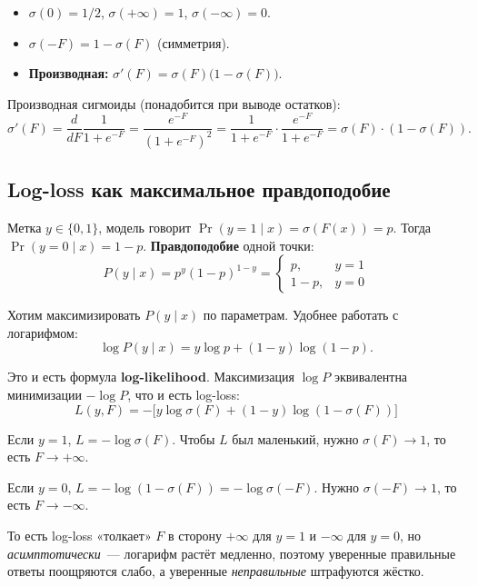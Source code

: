 \documentclass[12pt,a4paper]{article}
\begin{document}
\begin{itemize}
  \item $\sigma(0) = 1/2$, $\sigma(+\infty) = 1$, $\sigma(-\infty) = 0$.
  \item $\sigma(-F) = 1 - \sigma(F)$ (симметрия).
  \item \textbf{Производная:} $\sigma'(F) = \sigma(F)\bigl(1 - \sigma(F)\bigr)$.
\end{itemize}

\begin{derivation}
Производная сигмоиды (понадобится при выводе остатков):
\[
  \sigma'(F) = \frac{d}{dF}\frac{1}{1+e^{-F}}
  = \frac{e^{-F}}{(1+e^{-F})^2}
  = \frac{1}{1+e^{-F}} \cdot \frac{e^{-F}}{1+e^{-F}}
  = \sigma(F) \cdot (1 - \sigma(F)).
\]
\end{derivation}

\subsection{Log-loss как максимальное правдоподобие}

Метка $y \in \{0, 1\}$, модель говорит $\Pr(y = 1 \mid x) = \sigma(F(x)) = p$. Тогда $\Pr(y = 0 \mid x) = 1 - p$. \textbf{Правдоподобие} одной точки:
\[
  P(y \mid x) = p^y (1-p)^{1-y} =
  \begin{cases}
    p, & y = 1\\
    1-p, & y = 0
  \end{cases}
\]

Хотим максимизировать $P(y \mid x)$ по параметрам. Удобнее работать с логарифмом:
\[
  \log P(y \mid x) = y \log p + (1-y)\log(1-p).
\]

Это и есть формула \textbf{log-likelihood}. Максимизация $\log P$ эквивалентна минимизации $-\log P$, что и есть log-loss:
\[
  \boxed{
  L(y, F) = -\bigl[y \log \sigma(F) + (1-y)\log(1 - \sigma(F))\bigr]
  }
\]

\begin{intuition}
Если $y = 1$, $L = -\log \sigma(F)$. Чтобы $L$ был маленький, нужно $\sigma(F) \to 1$, то есть $F \to +\infty$.

Если $y = 0$, $L = -\log(1 - \sigma(F)) = -\log \sigma(-F)$. Нужно $\sigma(-F) \to 1$, то есть $F \to -\infty$.

То есть log-loss «толкает» $F$ в сторону $+\infty$ для $y = 1$ и $-\infty$ для $y = 0$, но \emph{асимптотически}~--- логарифм растёт медленно, поэтому уверенные правильные ответы поощряются слабо, а уверенные \emph{неправильные} штрафуются жёстко.
\end{intuition}
\end{document}
